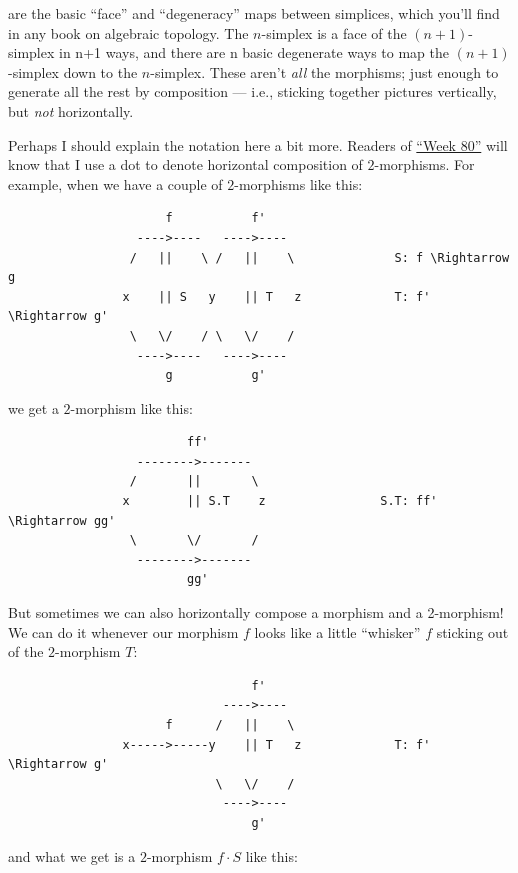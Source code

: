 \documentclass{article}
\begin{document}
are the basic ``face'' and ``degeneracy'' maps between simplices, which
you'll find in any book on algebraic topology. The \(n\)-simplex is a
face of the \((n+1)\)-simplex in n+1 ways, and there are n basic
degenerate ways to map the \((n+1)\)-simplex down to the \(n\)-simplex.
These aren't \emph{all} the morphisms; just enough to generate all the
rest by composition --- i.e., sticking together pictures vertically, but
\emph{not} horizontally.

Perhaps I should explain the notation here a bit more. Readers of
\protect\hyperlink{week80}{``Week 80''} will know that I use a dot to
denote horizontal composition of \(2\)-morphisms. For example, when we
have a couple of \(2\)-morphisms like this:

\begin{verbatim}
                      f           f'
                  ---->----   ---->----  
                 /   ||    \ /   ||    \              S: f \Rightarrow g
                x    || S   y    || T   z             T: f' \Rightarrow g'
                 \   \/    / \   \/    /
                  ---->----   ---->----
                      g           g'
\end{verbatim}

we get a \(2\)-morphism like this:

\begin{verbatim}
                         ff'
                  -------->-------
                 /       ||       \
                x        || S.T    z                S.T: ff' \Rightarrow gg'
                 \       \/       /
                  -------->-------
                         gg'
\end{verbatim}

But sometimes we can also horizontally compose a morphism and a
2-morphism! We can do it whenever our morphism \(f\) looks like a little
``whisker'' \(f\) sticking out of the \(2\)-morphism \(T\):

\begin{verbatim}
                                  f'
                              ---->----  
                      f      /   ||    \              
                x----->-----y    || T   z             T: f' \Rightarrow g'
                             \   \/    /
                              ---->----
                                  g'
\end{verbatim}

and what we get is a \(2\)-morphism \(f\cdot S\) like this:
\end{document}
